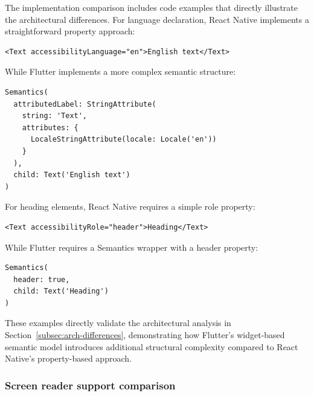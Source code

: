 {\FloatBarrier

The implementation comparison includes code examples that directly illustrate the architectural differences. For language declaration, React Native implements a straightforward property approach:

\begin{lstlisting}[caption=React Native language declaration, label=lst:react-native-language, basicstyle=\ttfamily\footnotesize]
<Text accessibilityLanguage="en">English text</Text>
\end{lstlisting}

\FloatBarrier

While Flutter implements a more complex semantic structure:

\begin{lstlisting}[caption=Flutter language declaration, label=lst:flutter-language, basicstyle=\ttfamily\footnotesize]
Semantics(
  attributedLabel: StringAttribute(
    string: 'Text',
    attributes: {
      LocaleStringAttribute(locale: Locale('en'))
    }
  ),
  child: Text('English text')
)
\end{lstlisting}

\FloatBarrier

For heading elements, React Native requires a simple role property:

\begin{lstlisting}[caption=React Native heading element, label=lst:react-native-heading, basicstyle=\ttfamily\footnotesize]
<Text accessibilityRole="header">Heading</Text>
\end{lstlisting}

\FloatBarrier

While Flutter requires a Semantics wrapper with a header property:

\begin{lstlisting}[caption=Flutter heading element, label=lst:flutter-heading, basicstyle=\ttfamily\footnotesize]
Semantics(
  header: true,
  child: Text('Heading')
)
\end{lstlisting}

\FloatBarrier

These examples directly validate the architectural analysis in Section~\ref{subsec:arch-differences}, demonstrating how Flutter's widget-based semantic model introduces additional structural complexity compared to React Native's property-based approach.

\subsubsection{Screen reader support comparison}
\label{subsubsec:screen-reader-support-comparison}

}
